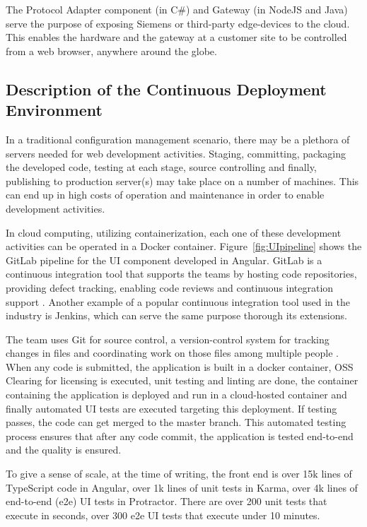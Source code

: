\documentclass[conference]{IEEEtran}
\begin{document}
	The Protocol Adapter component (in C\#) and Gateway (in NodeJS and Java) serve the purpose of exposing Siemens or third-party edge-devices to the cloud. 
	This enables the hardware and the gateway at a customer site to be controlled from a web browser, anywhere around the globe.

	\subsection{Description of the Continuous Deployment Environment }
	
	In a traditional configuration management scenario, there may be a plethora of servers needed for web development activities.
	Staging, committing, packaging the developed code, testing at each stage, source controlling and finally, publishing to production server(s) may take place on a number of machines.
	This can end up in high costs of operation and maintenance in order to enable development activities.
	
	In cloud computing, utilizing containerization, each one of these development activities can be operated in a Docker container.
	Figure~\ref{fig:UIpipeline} shows the GitLab pipeline for the UI component developed in Angular.
	GitLab is a continuous integration tool that supports the teams by hosting code repositories, providing defect tracking, enabling code reviews and continuous integration support \cite{wiki:gitlab}. 
	Another example of a popular continuous integration tool used in the industry is Jenkins, which can serve the same purpose thorough its extensions.


	The team uses Git for source control, a version-control system for tracking changes in files and coordinating work on those files among multiple people \cite{wiki:git}. 
	When any code is submitted, the application is built in a docker container, OSS Clearing for licensing is executed, unit testing and linting are done, the container containing the application is deployed and run in a cloud-hosted container and finally automated UI tests are executed targeting this deployment.
	If testing passes, the code can get merged to the master branch. 
	This automated testing process ensures that after any code commit, the application is tested end-to-end and the quality is ensured. 
	
	To give a sense of scale, at the time of writing, the front end is over 15k lines of TypeScript code in Angular, over 1k lines of unit tests in Karma, over 4k lines of end-to-end (e2e) UI tests in Protractor. 
	There are over 200 unit tests that execute in seconds, over 300 e2e UI tests that execute under 10 minutes. 
\end{document}
